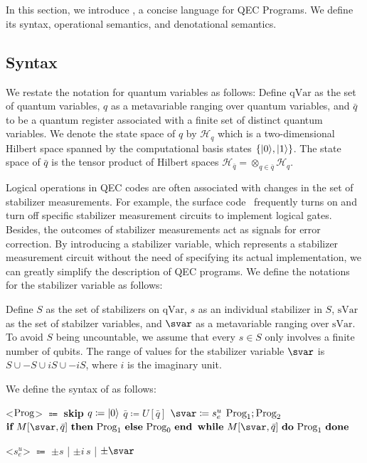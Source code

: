 \section{{\langname}}
In this section, we introduce {\langname}, a concise language for QEC Programs. We define its syntax, operational semantics, and denotational semantics. 



\subsection{Syntax}\label{subsect: syntax}
We restate the notation for quantum variables as follows:
Define $\text{qVar}$ as the set of quantum variables,  $q$ as a metavariable ranging over quantum variables, and $\bar{q}$ to be a quantum register associated with a finite set of distinct quantum variables. We denote the state space of $q$ by $\mathcal{H}_q$ which is a two-dimensional Hilbert space spanned by the computational basis states $\{\vert 0 \rangle, \vert 1 \rangle\}$. The state space of $\bar{q}$ is the tensor product of Hilbert spaces
$\mathcal{H}_{\bar{q}} = \otimes_{q\in \bar{q}}\mathcal{H}_q$.


Logical operations in QEC codes are often associated with changes in the set of stabilizer measurements. For example, the surface code~\cite{Fowler2012SurfaceCT} frequently turns on and turn off specific stabilizer measurement circuits to implement logical gates. Besides, the outcomes of stabilizer measurements act as signals for error correction. By introducing a stabilizer variable, which  represents a stabilizer measurement circuit without the need of specifying its actual implementation, we can greatly simplify the description of QEC programs. %
We define the notations for the stabilizer variable as follows:

Define $S$ as the set of stabilizers on $\text{qVar}$, $s$ as an individual stabilizer in $S$, $\text{sVar}$ as the set of stabilzer variables, and $\svar$ as a metavariable ranging over $\text{sVar}$. To avoid $S$ being uncountable, we assume that every $s \in S$ only involves a finite number of qubits. The range of values for the stabilizer variable $\svar$ is $S\cup -S \cup iS \cup -iS$, where $i$ is the imaginary unit.



We define the syntax of {\langname} as follows:
\begin{tcolorbox}[colback=yellow!10!white,
                  colframe=white!20!black]
%
\begin{grammar}

\label{equ:qeclang}
  \let\syntleft\relax
  \let\syntright\relax
%
<$\text{Prog}$> $\Coloneqq$ \textbf{skip}
\vsep $q \coloneqq \vert 0 \rangle$
\vsep $\bar{q} \coloneqq U[\bar{q}]$
\vsep $\svar \coloneqq s_e^u$
\alt $\text{Prog}_1;\text{Prog}_2$
\alt $\textbf{if}\ M[\svar,\bar{q}]\ \textbf{then}\  \prog_1\ \textbf{else}\ \prog_0\ \textbf{end}$
\alt $\textbf{while}\  M[\svar,\bar{q}]\ \textbf{do}\ \prog_1\ \textbf{done}$ %

<$s_e^u$> $\Coloneqq$ $\pm s$ | $\pm i\,s$ | $\pm \svar$
%
\end{grammar}
\end{tcolorbox}





